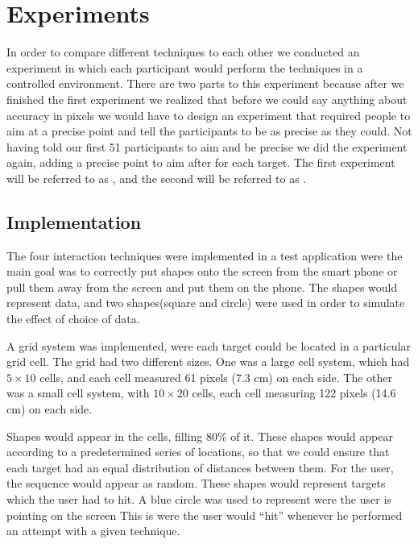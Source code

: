 \section{Experiments} \label{sec:experiment}
In order to compare  different techniques to each other we conducted an experiment in which each participant would perform the techniques in a controlled environment.
There are two parts to this experiment because after we finished the first experiment we realized that before we could say anything about accuracy in pixels we would have to design an experiment that required people to aim at a precise point and tell the participants to be as precise as they could.
Not having told our first 51 participants to aim and be precise we did the experiment again, adding a precise point to aim after for each target.
The first  experiment will be referred to as \target, and the second will be referred to as \accuracy.

\subsection{Implementation}

The four interaction techniques were implemented in a test application were the main goal was to correctly put shapes onto the screen from the smart phone or pull them away from the screen and put them on the phone.
The shapes would represent data, and two shapes(square and circle) were used in order to simulate the effect of choice of data. 

A grid system was implemented, were each target could be located in a particular grid cell.
The grid had two different sizes.
One was a large cell system, which had $5\times10$ cells, and each cell measured 61 pixels (7.3 cm) on each side.
The other was a small cell system, with $10\times20$ cells, each cell measuring 122 pixels (14.6 cm)  on each side. 

Shapes would appear in the cells, filling 80\% of it. 
These shapes would appear according to a predetermined series of locations, so that we could ensure that each target had an equal distribution of distances between them. 
For the user, the sequence would appear as random. 
These shapes would represent targets which the user had to hit.
A blue circle was used to represent were the user is pointing on the screen
This is were the user would ``hit'' whenever he performed an attempt with a given technique.

